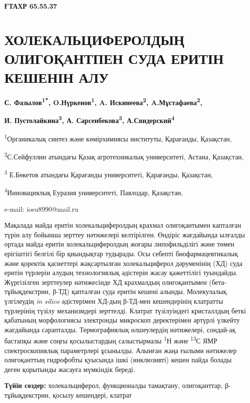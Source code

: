 \clearpage
{\bfseries ҒТАХР 65.55.37}

\section{ХОЛЕКАЛЬЦИФЕРОЛДЫҢ ОЛИГОҚАНТПЕН СУДА ЕРИТІН КЕШЕНІН АЛУ}

\begin{center}
{\bfseries С. Фазылов\textsuperscript{1*}, O.Нүркенов\textsuperscript{1},
A. Искинеева\textsuperscript{2}, A.Мұстафаева\textsuperscript{2},}

{\bfseries И. Пустолайкина\textsuperscript{3}, А.
Сарсенбекова\textsuperscript{3}, А.Свидерский\textsuperscript{4}}

\textsuperscript{1}Органикалық синтез және көмірхимиясы институты,
Қарағанды, Қазақстан,

\textsuperscript{2}С.Сейфуллин атындағы Қазақ агротехникалық
университеті, Астана, Қазақстан,

\textsuperscript{3} Е.Бөкетов атындағы Қарағанды университеті,
Қарағанды, Қазақстан,

\textsuperscript{4}Инновациялық Еуразия университеті, Павлодар,
Қазақстан,

e-mail: iosu8990@mail.ru
\end{center}

Мақалада майда еритін холекальциферолдың крахмал олигоқантымен капталған
түрін алу бойынша зерттеу нәтижелері келтірілген. Өндіріс жағдайында
ылғалды ортада майда еритін холекальциферолдың жоғары липофильділігі
және төмен ерігіштігі белгілі бір қиындықтар тудырады. Осы себепті
биофармацевтикалық және қоректік қасиеттері жақсартылған холекальциферол
дәруменінің (ХД) суда еритін түрлерін алудың технологиялық әдістерін
жасау қажеттілігі туындайды. Жүргізілген зерттеулер нәтижесінде ХД
крахмалдың олигоқантымен (бета-тұйықдекстрин, β-ТД) қапталған суда
еритін кешені алынды. Молекулалық үлгілеудің \emph{in silico}
әдістерімен ХД-дың β-ТД-мен кешендерінің клатратты түрлерінің түзілу
механизмдері зерттелді. Клатрат түзілуіндегі кристаллдың беткі қабатының
морфологиясы электронды микроскоп деректерімен әртүрлі үлкейту
жағдайында сарапталды. Термографиялық өлшеулердің нәтижелері, сондай-ақ
бастапқы және соңғы қосылыстардың салыстырмалы \textsuperscript{1}Н және
\textsuperscript{13}С ЯМР спектроскопиялық параметрлері ұсынылды.
Алынған жаңа ғылыми нәтижелер олигоқанттың гидрофобты қуысында ішкі
(инклюзивті) кешен пайда болады деген қорытынды жасауға мүмкіндік
береді.

{\bfseries Түйін сөздер:} холекальциферол, функционалды тамақтану,
олигоқанттар, β-тұйықдекстрин, қосылу кешендері, клатрат

